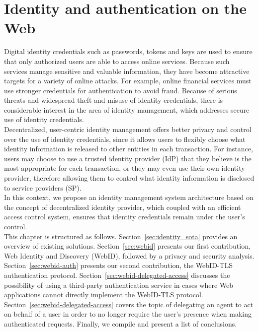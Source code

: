\chapter{Identity and authentication on the Web}
\label{ch:identity}
Digital identity credentials such as passwords, tokens and keys are used to ensure that only authorized users are able to access online services. Because such services manage sensitive and valuable information, they have become attractive targets for a variety of online attacks. For example, online financial services must use stronger credentials for authentication to avoid fraud. Because of serious threats and widespread theft and misuse of identity credentials, there is considerable interest in the area of identity management, which addresses secure use of identity credentials.\\

Decentralized, user-centric identity management offers better privacy and control over the use of identity credentials, since it allows users to flexibly choose what identity information is released to other entities in each transaction. For instance, users may choose to use a trusted identity provider (IdP) that they believe is the most appropriate for each transaction, or they may even use their own identity provider, therefore allowing them to control what identity information is disclosed to service providers (SP).\\

In this context, we propose an identity management system architecture based on the concept of decentralized identity provider, which coupled with an efficient access control system, ensures that identity credentials remain under the user's control.\\

This chapter is structured as follows. Section~\ref{sec:identity_sota} provides an overview of existing solutions. Section~\ref{sec:webid} presents our first contribution, Web Identity and Discovery (WebID), followed by a privacy and security analysis. Section~\ref{sec:webid-auth} presents our second contribution, the WebID-TLS authentication protocol. Section~\ref{sec:webid-delegated-access} discusses the possibility of using a third-party authentication service in cases where Web applications cannot directly implement the WebID-TLS protocol. Section~\ref{sec:webid-delegated-access} covers the topic of delegating an agent to act on behalf of a user in order to no longer require the user's presence when making authenticated requests. Finally, we compile and present a list of conclusions.

